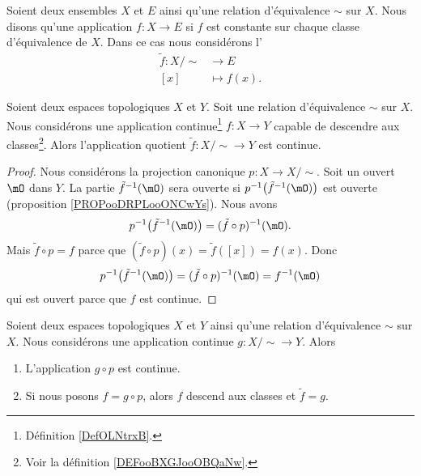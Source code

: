 \begin{definition}       \label{DEFooBXGJooOBQaNw}
	Soient deux ensembles \( X\) et \( E\) ainsi qu'une relation d'équivalence \( \sim\) sur \( X\). Nous disons qu'une application \( f\colon X\to E\)  si \( f\) est constante sur chaque classe d'équivalence de \( X\). Dans ce cas nous considérons l'
	\begin{equation}
		\begin{aligned}
			\tilde f\colon X/\sim & \to E         \\
			[x]                   & \mapsto f(x).
		\end{aligned}
	\end{equation}
\end{definition}

\begin{lemma}     \label{LEMooKTINooKDjNeX}
	Soient deux espaces topologiques \( X\) et \( Y\). Soit une relation d'équivalence \( \sim\) sur \( X\). Nous considérons une application continue\footnote{Définition \ref{DefOLNtrxB}.} \( f\colon X\to Y\) capable de descendre aux classes\footnote{Voir la définition \ref{DEFooBXGJooOBQaNw}.}. Alors l'application quotient \( \tilde f\colon X/\sim\to Y\) est continue.
\end{lemma}

\begin{proof}
	Nous considérons la projection canonique \( p\colon X\to X/\sim\). Soit un ouvert \( \mO\) dans \( Y\). La partie \( \tilde f^{-1}(\mO)\) sera ouverte si \( p^{-1}\big( \tilde f^{-1}(\mO) \big)\) est ouverte (proposition \ref{PROPooDRPLooONCwYs}). Nous avons
	\begin{equation}
		p^{-1}\big( \tilde f^{-1}(\mO) \big)=(\tilde f\circ p)^{-1}(\mO).
	\end{equation}
	Mais \( \tilde f\circ p=f\) parce que \( (\tilde f\circ p)(x)=\tilde f([x])=f(x)\). Donc
	\begin{equation}
		p^{-1}\big( \tilde f^{-1}(\mO) \big)=(\tilde f\circ p)^{-1}(\mO)=f^{-1}(\mO)
	\end{equation}
	qui est ouvert parce que \( f\) est continue.
\end{proof}


\begin{lemma}	\label{LEMooIGLQooIMSWYg}
	Soient deux espaces topologiques \( X\) et \( Y\) ainsi qu'une relation d'équivalence \( \sim\) sur \( X\). Nous considérons une application continue \( g\colon X/\sim\to Y\). Alors
	\begin{enumerate}
		\item
		      L'application \( g\circ p\) est continue.
		\item
		      Si nous posons \( f=g\circ p\), alors \( f\) descend aux classes et \( \tilde f=g\).
	\end{enumerate}
\end{lemma}

